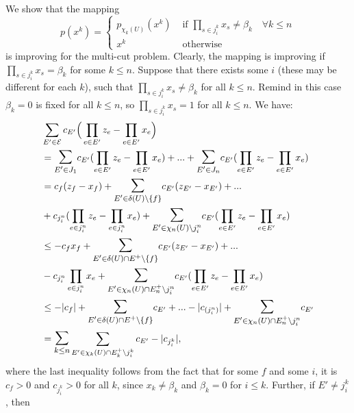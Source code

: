 We show that the mapping \[ p(x^k)= \begin{cases}
    p_{\chi_k(U)}(x^k) & \text{ if  } \prod_{s \in j^k_i} x_s \neq \beta_k \quad \forall k \leq  n\\
    x^k & \text{ otherwise } 
\end{cases} \]
is improving for the multi-cut problem. Clearly, the mapping is improving if $\prod_{s \in j^k_i} x_s = \beta_k$ for some $k \leq n$. Suppose that there exists some $i$ (these may be different for each $k$), such that $\prod_{s \in j^k_i} x_s \neq \beta_k$ for all $k \leq n$. Remind in this case $\beta_k =0$ is fixed for all $k \leq n$, so $\prod_{s \in j^k_i} x_s=1$ for all $k \leq n$. We have:  
\begin{equation*}
    \begin{split}
    & \sum_{E' \in \mathcal{E}} c_{E'} \Big( \prod_{e \in E'} z_e - \prod_{e \in E'} x_e \Big) \\ 
    & = \mathlarger{\mathlarger{\sum}}_{E' \in J_1} c_{E'} (\prod_{e \in E'} z_e - \prod_{e \in E'} x_e ) + ...  +    \mathlarger{\mathlarger{\sum}}_{E' \in J_n} c_{E'} (\prod_{e \in E'} z_e - \prod_{e \in E'} x_e ) \\
    &= c_{f}(z_{f} - x_{f}) + \mathlarger{\mathlarger{\sum}}_{E' \in \delta(U) \setminus \{f \} } c_{E'} (z_{E'}-x_{E'}) + ... \\
    &+ c_{j^n_i} ( \prod_{e \in j^n_i} z_{e} -\prod_{e \in j^n_i} x_{e})+ 
    \mathlarger{\mathlarger{\sum}}_{E' \in \chi_n(U) \setminus j^n_i } c_{E'} (\prod_{e \in E'} z_e - \prod_{e \in E'} x_e ) \\ 
    & \leq -c_{f}x_{f} + \mathlarger{\mathlarger{\sum}}_{E' \in \delta(U) \cap E^+ \setminus \{f \} } c_{E'} (z_{E'}-x_{E'}) + ... \\
    & -c_{j^n_i}\prod_{e \in j^n_i} x_{e}+ 
    \mathlarger{\mathlarger{\sum}}_{E' \in \chi_n(U) \cap E^+_n \setminus j^n_i } c_{E'} (\prod_{e \in E'} z_e - \prod_{e \in E'} x_e ) \\ 
    & \leq - |c_{f}| + \mathlarger{\mathlarger{\sum}}_{E' \in \delta(U) \cap E^+ \setminus \{f \} } c_{E'} + ... - |c_{(j^n_i)}| +  \mathlarger{\mathlarger{\sum}}_{E' \in  \chi_n(U) \cap E^+_n \setminus j^n_i } c_{E'}\\
    & = \mathlarger{\mathlarger{\sum}}_{k \leq n} \sum_{E' \in \chi_k(U)\cap E^+_k \setminus j^k_i} c_{E'}  - |c_{j^k_i}|,   
    \end{split}
\end{equation*}
where the last inequality follows from the fact that for some $f$ and some $i$, it is $c_f > 0$ and $c_{j^k_i} > 0$ for all $k$, since $x_k \neq \beta_k$ and $\beta_k=0$ for $i \leq k$. Further, if $E' \neq j^k_i$, then 
